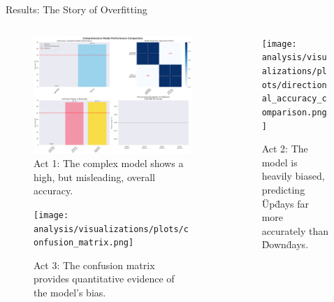 \documentclass[final]{beamer}
\begin{document}
\begin{frame}[t]
\begin{columns}[T]
    \begin{column}{0.6\linewidth}
      \begin{block}{Results: The Story of Overfitting}
        \begin{columns}[T]
            \begin{column}{0.5\linewidth}
                \begin{figure}
                    \includegraphics[width=\linewidth]{analysis/visualizations/plots/model_comparison.png}
                    \caption{Act 1: The complex model shows a high, but misleading, overall accuracy.}
                \end{figure}
                \begin{figure}
                    \texttt{[image: analysis/visualizations/plots/confusion\_matrix.png]}
                    \caption{Act 3: The confusion matrix provides quantitative evidence of the model's bias.}
                \end{figure}
            \end{column}
            \begin{column}{0.5\linewidth}
                \begin{figure}
                    \texttt{[image: analysis/visualizations/plots/directional\_accuracy\_comparison.png]}
                    \caption{Act 2: The model is heavily biased, predicting \"Up\" days far more accurately than \"Down\" days.}
                \end{figure}
                \begin{figure}

\end{figure}
\end{column}
\end{columns}
\end{block}
\end{column}
\end{columns}
\end{frame}
\end{document}
